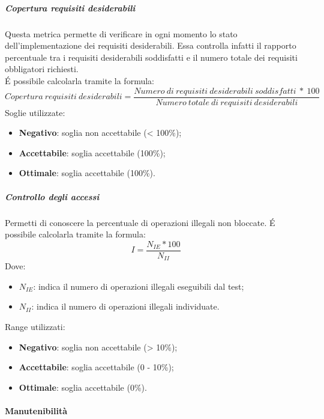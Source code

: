 \documentclass[../PianoDiQualifica.tex]{subfiles}
\begin{document}
			\subparagraph{Copertura requisiti desiderabili}
			Questa metrica permette di verificare in ogni momento lo stato dell'implementazione dei requisiti desiderabili. Essa controlla infatti il rapporto percentuale tra i requisiti desiderabili soddisfatti e il numero totale dei requisiti obbligatori richiesti.\\
			É possibile calcolarla tramite la formula:
				\begin{equation*}
					Copertura \ requisiti \ desiderabili = \frac{Numero \ di \ requisiti \ desiderabili \ soddisfatti \ * \ 100}{Numero \ totale \ di \ requisiti \ desiderabili}
				\end{equation*}
				Soglie utilizzate:
				\begin{itemize}
					\item \textbf{Negativo}: soglia non accettabile (< 100\%);
					\item \textbf{Accettabile}: soglia accettabile (100\%);
					\item \textbf{Ottimale}: soglia accettabile (100\%).
				\end{itemize}

			\subparagraph{Controllo degli accessi}
			Permetti di conoscere la percentuale di operazioni illegali non bloccate.
			É possibile calcolarla tramite la formula:
				\begin{equation*}
					I = \frac{N_{IE} * 100}{N_{II}}
				\end{equation*}
				Dove:
				\begin{itemize}
					\item \textbf{$N_{IE}$}: indica il numero di operazioni illegali eseguibili dal test;
					\item \textbf{$N_{II}$}: indica il numero di operazioni illegali individuate.
				\end{itemize}
				Range utilizzati:
				\begin{itemize}
					\item \textbf{Negativo}: soglia non accettabile (> 10\%);
					\item \textbf{Accettabile}: soglia accettabile (0 - 10\%);
					\item \textbf{Ottimale}: soglia accettabile (0\%).
				\end{itemize}

			\paragraph{Manutenibilità}
\end{document}
